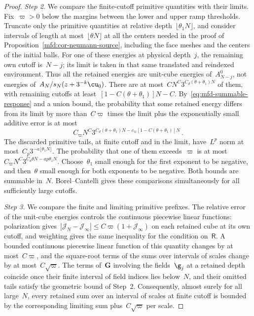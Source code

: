 \documentclass[11pt]{amsart}
\begin{document}
\begin{proof}
\smallskip

\emph{Step 2.} We compare the finite-cutoff primitive quantities with their limits. Fix~$\varpi>0$ below the margins between the lower and upper ramp thresholds. Truncate only the primitive quantities at relative depth~$\lfloor\theta_1N\rfloor$, and consider intervals of length at most~$\lfloor\theta N\rfloor$ at all the centers needed in the proof of Proposition~\ref{mfd:cor-neumann-source}, including the face meshes and the centers of the initial balls. For one of these energies at physical depth~$j$, the remaining own cutoff is~$N-j$; its limit is taken in that same translated and reindexed environment. Thus all the retained energies are unit-cube energies of~$A_{N-j}^0$, not energies of~$A_N/s_N(z+3^{-k}\cu_0)$. There are at most~$CN^C3^{C_d(\theta+\theta_1)N}$ of them, with remaining cutoffs at least~$[1-C(\theta+\theta_1)]N-C$. By~\eqref{eq:mfd-summable-response} and a union bound, the probability that some retained energy differs from its limit by more than~$C\varpi$ times the limit plus the exponentially small additive error is at most
\begin{equation*}
	C_\varpi N^C3^{C_d(\theta+\theta_1)N-c_\varpi[1-C(\theta+\theta_1)]N}\,.
\end{equation*}
The discarded primitive tails, at finite cutoff and in the limit, have~$L^p$ norm at most~$C_p3^{-a\lfloor\theta_1N\rfloor}$. The probability that one of them exceeds~$\varpi$ is at most~$C_\varpi N^C3^{C_d\theta N-ap\theta_1N}$. Choose~$\theta_1$ small enough for the first exponent to be negative, and then~$\theta$ small enough for both exponents to be negative. Both bounds are summable in~$N$. Borel--Cantelli gives these comparisons simultaneously for all sufficiently large cutoffs.

\smallskip

\emph{Step 3.} We compare the finite and limiting primitive prefixes. The relative error of the unit-cube energies controls the continuous piecewise linear functions: polarization gives~$|\mathcal J_N-\mathcal J_\infty|\leq C\varpi(1+\mathcal J_\infty)$ on each retained cube at its own cutoff, and weighting gives the same inequality for the condition on~$\mathsf R$. A bounded continuous piecewise linear function of this quantity changes by at most~$C\varpi$, and the square-root terms of the sums over intervals of scales change by at most~$C\sqrt\varpi$. The terms of~$\mathbf G$ involving the fields~$\g_j$ at a retained depth coincide once their finite interval of field indices lies below~$N$, and their omitted tails satisfy the geometric bound of Step~2. Consequently, almost surely for all large~$N$, every retained sum over an interval of scales at finite cutoff is bounded by the corresponding limiting sum plus~$C\sqrt\varpi$ per scale.


\end{proof}
\end{document}

